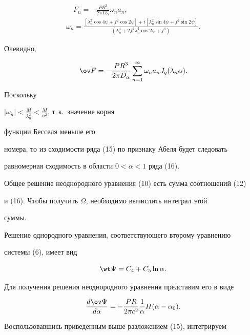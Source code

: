 \begin{pf}
\begin{gather*}
\quad F_n=-\frac{P R^3}{2\pi D_\alpha}\omega_n a_n,\\ 


\omega_n=\frac{[\lambda^2_n\cos4\psi+f^2\cos2\psi]+ 


i[\lambda^2_n\sin4\psi+f^2\sin2\psi]} 


{(\lambda^4_n+2f^2\lambda^2_n\cos2\psi+f^4)}. 


\end{gather*} 


Очевидно, 


\begin{equation} 


\ov F=-\frac{P R^3}{2\pi D_\alpha}\sum^\infty_{n=1} 


\omega_n a_n J_q(\lambda_n\alpha). 


\end{equation} 


Поскольку 


$|\omega_n|<\frac{M}{\lambda^2_n}<\frac{M}{n^2}$, т.\,к.~значение корня 


функции Бесселя меньше его 


номера, то из сходимости ряда (15) по признаку Абеля будет следовать 


равномерная сходимость в области $0<\alpha<1$ ряда (16). 


 


Общее решение неоднородного уравнения (10) есть сумма соотношений (12) 


и (16). Чтобы получить $\Omega$, необходимо вычислить интеграл этой 


суммы. 


Решение однородного уравнения, соответствующего второму уравнению 


системы (6), имеет вид 


\begin{equation} 


\wt\Psi=C_4+C_5\ln\alpha. 


\end{equation} 


Для получения решения неоднородного уравнения представим его в виде 


$$ 


\myfrac{\ov\Psi}{}=-\frac{P R}{2\pi c^2}\frac{1}{\alpha} 


H(\alpha-\alpha_0). 


$$ 


Воспользовавшись приведенным выше разложением (15), интегрируем 



\end{pf}
